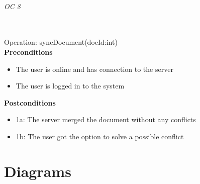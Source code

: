\documentclass[a4paper,11pt,report]{report}
\begin{document}
\subparagraph{OC 8} \mbox{} \\
Operation: syncDocument(docId:int) \\
\textbf{Preconditions}
\begin{itemize}
\item The user is online and has connection to the server
\item The user is logged in to the system
\end{itemize} 
\textbf{Postconditions}
\begin{itemize}
\item 1a: The server merged the document without any conflicts
\item 1b: The user got the option to solve a possible conflict
\end{itemize} 

\chapter{Diagrams}
\end{document}
